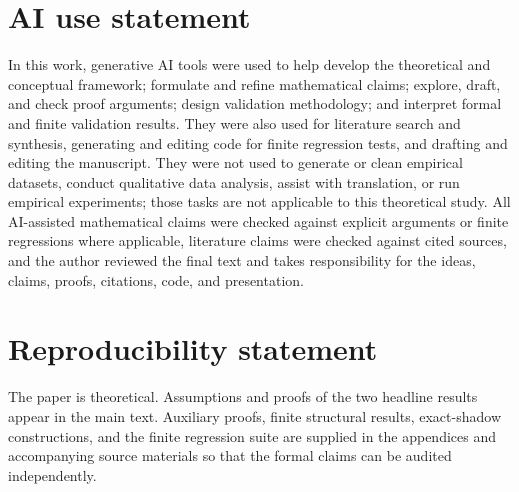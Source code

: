 \documentclass[11pt]{article}
\begin{document}
\section*{AI use statement}
In this work, generative AI tools were used to help develop the theoretical and conceptual framework; formulate and refine mathematical claims; explore, draft, and check proof arguments; design validation methodology; and interpret formal and finite validation results. They were also used for literature search and synthesis, generating and editing code for finite regression tests, and drafting and editing the manuscript. They were not used to generate or clean empirical datasets, conduct qualitative data analysis, assist with translation, or run empirical experiments; those tasks are not applicable to this theoretical study. All AI-assisted mathematical claims were checked against explicit arguments or finite regressions where applicable, literature claims were checked against cited sources, and the author reviewed the final text and takes responsibility for the ideas, claims, proofs, citations, code, and presentation.

\section*{Reproducibility statement}
The paper is theoretical. Assumptions and proofs of the two headline results appear in the main text. Auxiliary proofs, finite structural results, exact-shadow constructions, and the finite regression suite are supplied in the appendices and accompanying source materials so that the formal claims can be audited independently.




\appendix





\end{document}
